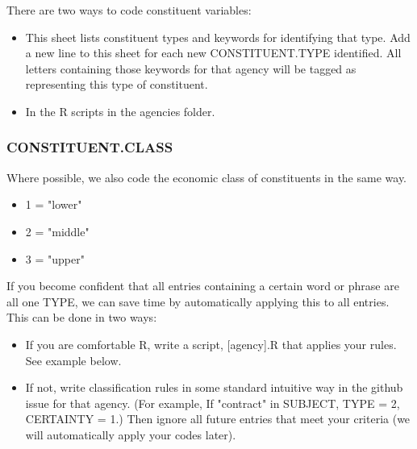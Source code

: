 \documentclass{article}
\begin{document}
There are two ways to code constituent variables:
\begin{itemize}
\item[1)]This sheet lists constituent types and keywords for identifying that type. Add a new line to this sheet for each new CONSTITUENT.TYPE identified. All letters containing those keywords for that agency will be tagged as representing this type of constituent. 
 \item[2)] In the R scripts in the agencies folder.
\end{itemize}

 
\subsubsection{CONSTITUENT.CLASS}
Where possible, we also code the economic class of constituents in the same way. 
\begin{itemize}
\item[] 1 = "lower" 
\item[] 2 = "middle" 
\item[] 3 = "upper" 
\end{itemize}


If you become confident that all entries containing a certain word or phrase are all one TYPE, we can save time by automatically applying this to all entries. This can be done in two ways:
\begin{itemize}
\item[1)] If you are comfortable R, write a script, [agency].R that applies your rules. See example below.
\item[2)] If not, write classification rules in some standard intuitive way in the github issue for that agency. (For example, If "contract" in SUBJECT, TYPE = 2, CERTAINTY = 1.) Then ignore all future entries that meet your criteria (we will automatically apply your codes later).
\end{itemize}
\end{document}
